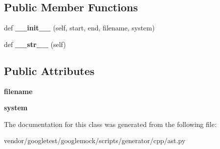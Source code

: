 \subsection*{Public Member Functions}
\begin{DoxyCompactItemize}
\item 
\mbox{\label{classcpp_1_1ast_1_1_include_a41b000a9f16a9a1840e56a761bb7045c}} 
def {\bfseries \+\_\+\+\_\+init\+\_\+\+\_\+} (self, start, end, filename, system)
\item 
\mbox{\label{classcpp_1_1ast_1_1_include_ad7d9e5e8f46dcb1a91a282e609412a3e}} 
def {\bfseries \+\_\+\+\_\+str\+\_\+\+\_\+} (self)
\end{DoxyCompactItemize}
\subsection*{Public Attributes}
\begin{DoxyCompactItemize}
\item 
\mbox{\label{classcpp_1_1ast_1_1_include_a9ecff64f127655d3c17e9abe4ebe3852}} 
{\bfseries filename}
\item 
\mbox{\label{classcpp_1_1ast_1_1_include_a2e8e535b1af7d9b0ff94d0ae9f86e5c5}} 
{\bfseries system}
\end{DoxyCompactItemize}


The documentation for this class was generated from the following file\+:\begin{DoxyCompactItemize}
\item 
vendor/googletest/googlemock/scripts/generator/cpp/ast.\+py\end{DoxyCompactItemize}
